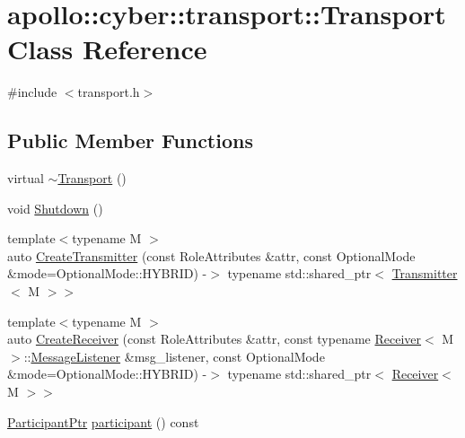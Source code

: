 \hypertarget{classapollo_1_1cyber_1_1transport_1_1Transport}{\section{apollo\-:\-:cyber\-:\-:transport\-:\-:Transport Class Reference}
\label{classapollo_1_1cyber_1_1transport_1_1Transport}
}


{\ttfamily \#include $<$transport.\-h$>$}

\subsection*{Public Member Functions}
\begin{DoxyCompactItemize}
\item 
virtual \hyperlink{classapollo_1_1cyber_1_1transport_1_1Transport_a549c846a9b3b12b6ee2d7660c6557eba}{$\sim$\-Transport} ()
\item 
void \hyperlink{classapollo_1_1cyber_1_1transport_1_1Transport_a0f2be2c5c615131524b3222b2af4a0bd}{Shutdown} ()
\item 
{\footnotesize template$<$typename M $>$ }\\auto \hyperlink{classapollo_1_1cyber_1_1transport_1_1Transport_abaa70188baae499bd7b253232add0d79}{Create\-Transmitter} (const Role\-Attributes \&attr, const Optional\-Mode \&mode=Optional\-Mode\-::\-H\-Y\-B\-R\-I\-D) -\/$>$ typename std\-::shared\-\_\-ptr$<$ \hyperlink{classapollo_1_1cyber_1_1transport_1_1Transmitter}{Transmitter}$<$ M $>$$>$
\item 
{\footnotesize template$<$typename M $>$ }\\auto \hyperlink{classapollo_1_1cyber_1_1transport_1_1Transport_aca8d88aff9d498c0aaf5e98cbe842371}{Create\-Receiver} (const Role\-Attributes \&attr, const typename \hyperlink{classapollo_1_1cyber_1_1transport_1_1Receiver}{Receiver}$<$ M $>$\-::\hyperlink{namespaceapollo_1_1cyber_1_1transport_aade3f4d41770972ae44166cdde27e2d8}{Message\-Listener} \&msg\-\_\-listener, const Optional\-Mode \&mode=Optional\-Mode\-::\-H\-Y\-B\-R\-I\-D) -\/$>$ typename std\-::shared\-\_\-ptr$<$ \hyperlink{classapollo_1_1cyber_1_1transport_1_1Receiver}{Receiver}$<$ M $>$$>$
\item 
\hyperlink{namespaceapollo_1_1cyber_1_1transport_a4214d0780331276d0384d0b57e3bc688}{Participant\-Ptr} \hyperlink{classapollo_1_1cyber_1_1transport_1_1Transport_a4214cebf15d20ad3de4e122a3d712e52}{participant} () const 
\end{DoxyCompactItemize}
